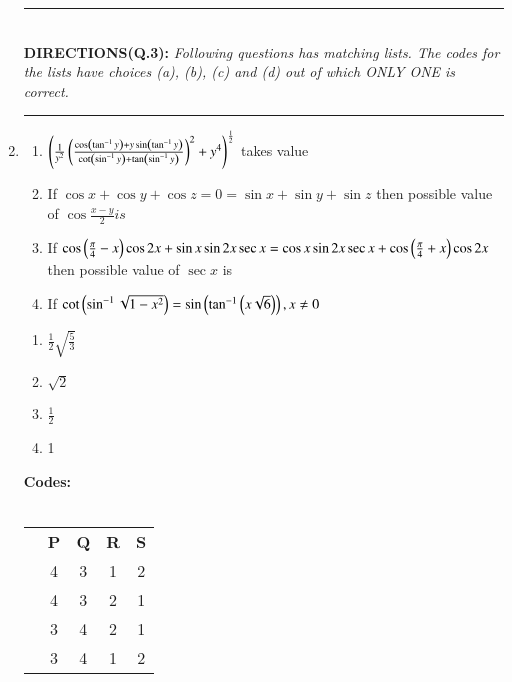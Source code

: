 \documentclass[journal,12pt,twocolumn]{IEEEtran}
\theoremstyle{remark}
\begin{document}
\begin{enumerate}
	\hrule
		\text{}\\
		\textbf{DIRECTIONS(Q.3): }\textit{Following questions has matching lists. The codes for the lists have choices (a), (b), (c) and (d) out of which ONLY ONE is correct.}\\
	\hrule

	\item{
		\begin{multicols}{2}
			\begin{enumerate}
				\item{$\left(\frac{1}{y^2}\left(\frac{\cos\left(\tan^{-1}y\right)+y\sin\left(\tan^{-1}y\right)}{\cot\left(\sin^{-1}y\right)+\tan\left(\sin^{-1}y\right)}\right)^2 + y^4\right)^\frac{1}{2}$} takes value\\
				\item{If $\cos x+\cos y+\cos z = 0 = \sin x+\sin y+\sin z$ then possible value of $\cos\frac{x-y}{2} is$}\\
				\item{If $\cos\left(\frac{\pi}{4}-x\right) \cos 2x+\sin x\sin 2x\sec x=\cos x\sin 2x\sec x+\cos\left(\frac{\pi}{4}+x\right)\cos 2x$ then possible value of $\sec x$ is}\\
				\item{If $\cot\left(\sin^{-1}\sqrt{1-x^2}\right)=\sin\left(\tan^{-1}\left(x\sqrt{6}\right)\right),x\neq 0$}
			\end{enumerate}
			\columnbreak
			\begin{enumerate}
				\item{$\frac{1}{2}\sqrt{\frac{5}{3}}$}\\
				\item{$\sqrt{2}$}\\
				\item{$\frac{1}{2}$}\\
				\item{1}
			\end{enumerate}
		\end{multicols}
		\textbf{Codes:}\\
		\\
		\begin{tabular}{c c c c c}
			& \textbf{P} & \textbf{Q} & \textbf{R} & \textbf{S} \\
			\brak{a} & 4 & 3 & 1 & 2 \\
			\brak{b} & 4 & 3 & 2 & 1 \\
			\brak{c} & 3 & 4 & 2 & 1 \\
			\brak{d} & 3 & 4 & 1 & 2 \\
		\end{tabular}
		}
\end{enumerate}
\end{document}
